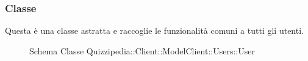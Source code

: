 \subsubsection{Classe }
Questa è una classe astratta e raccoglie le funzionalità comuni a tutti gli utenti.
\begin{figure}[H]
\centering
\noindent{}
\caption[Schema Classe User]{Schema Classe Quizzipedia::Client::ModelClient::Users::User}
\end{figure}
